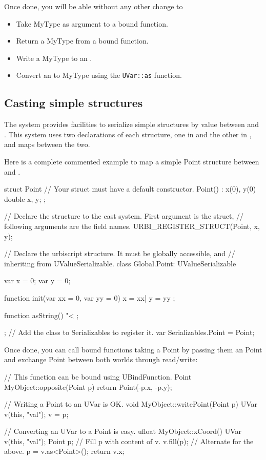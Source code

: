 Once done, you will be able without any other change to
\begin{itemize}
\item Take MyType as argument to a bound function.
\item Return a MyType from a bound function.
\item Write a MyType to an \UVar.
\item Convert an \UVar to MyType using the \lstinline{UVar::as} function.
\end{itemize}

\subsection{Casting simple structures}

The system provides facilities to serialize simple structures by value
between \Cxx and \us. This system uses two declarations of each structure,
one in \Cxx and the other in \urbi, and maps between the two.

Here is a complete commented example to map a simple Point structure between
\us and \Cxx.
\begin{cxx}
struct Point
{
  // Your struct must have a default constructor.
  Point()
    : x(0), y(0)
  {}
  double x, y;
};

// Declare the structure to the cast system. First argument is the struct,
// following arguments are the field names.
URBI_REGISTER_STRUCT(Point, x, y);
\end{cxx}

\begin{urbiunchecked}
// Declare the urbiscript structure. It must be globally accessible, and
// inheriting from UValueSerializable.
class Global.Point: UValueSerializable
{
  var x = 0;
  var y = 0;

  function init(var xx = 0, var yy = 0)
  {
    x = xx|
    y = yy
  };

  function asString()
  {
    "<%
  };
};
// Add the class to Serializables to register it.
var Serializables.Point = Point;
\end{urbiunchecked}

Once done, you can call bound functions taking a \Cxx Point by passing them
an \us Point and exchange Point between both worlds through \UVar
read/write:

\begin{cxx}
// This function can be bound using UBindFunction.
Point MyObject::opposite(Point p)
{
  return Point(-p.x, -p.y);
}

// Writing a Point to an UVar is OK.
void MyObject::writePoint(Point p)
{
  UVar v(this, "val");
  v = p;
}

// Converting an UVar to a Point is easy.
ufloat MyObject::xCoord()
{
  UVar v(this, "val");
  Point p;
  // Fill p with content of v.
  v.fill(p);
  // Alternate for the above.
  p = v.as<Point>();
  return v.x;
}
\end{cxx}


